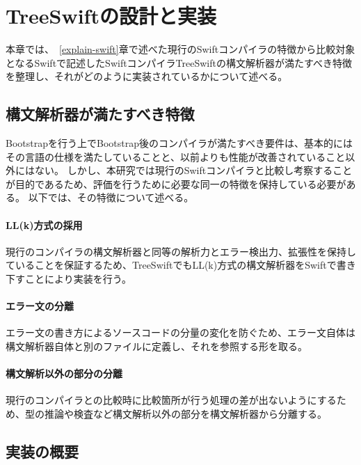 \chapter{TreeSwiftの設計と実装}
\label{treeswift}

本章では、~\ref{explain-swift}章で述べた現行のSwiftコンパイラの特徴から比較対象となるSwiftで記述したSwiftコンパイラTreeSwiftの構文解析器が満たすべき特徴を整理し、それがどのように実装されているかについて述べる。

\section{構文解析器が満たすべき特徴}
\label{treeswift:requirements}

Bootstrapを行う上でBootstrap後のコンパイラが満たすべき要件は、基本的にはその言語の仕様を満たしていることと、以前よりも性能が改善されていること以外にはない。
しかし、本研究では現行のSwiftコンパイラと比較し考察することが目的であるため、評価を行うために必要な同一の特徴を保持している必要がある。
以下では、その特徴について述べる。

\subsubsection{LL(k)方式の採用}

現行のコンパイラの構文解析器と同等の解析力とエラー検出力、拡張性を保持していることを保証するため、TreeSwiftでもLL(k)方式の構文解析器をSwiftで書き下すことにより実装を行う。

\subsubsection{エラー文の分離}

エラー文の書き方によるソースコードの分量の変化を防ぐため、エラー文自体は構文解析器自体と別のファイルに定義し、それを参照する形を取る。

\subsubsection{構文解析以外の部分の分離}

現行のコンパイラとの比較時に比較箇所が行う処理の差が出ないようにするため、型の推論や検査など構文解析以外の部分を構文解析器から分離する。


\section{実装の概要}

